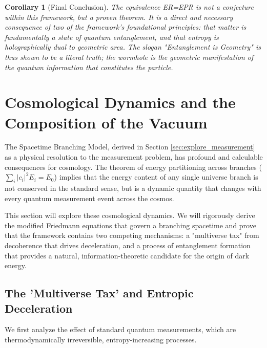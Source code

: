 \documentclass[11pt, letterpaper]{report}
\theoremstyle{plain} %
\newtheorem{corollary}[theorem]{Corollary}
\theoremstyle{definition} %
\theoremstyle{remark} %
\begin{document}
\begin{corollary}[Final Conclusion]
The equivalence ER=EPR is not a conjecture within this framework, but a proven theorem. It is a direct and necessary consequence of two of the framework's foundational principles: that matter is fundamentally a state of quantum entanglement, and that entropy is holographically dual to geometric area. The slogan "Entanglement is Geometry" is thus shown to be a literal truth; the wormhole is the geometric manifestation of the quantum information that constitutes the particle.
\end{corollary}






\section{Cosmological Dynamics and the Composition of the Vacuum}
\label{sec:explore_cosmology}

The Spacetime Branching Model, derived in Section \ref{sec:explore_measurement} as a physical resolution to the measurement problem, has profound and calculable consequences for cosmology. The theorem of energy partitioning across branches ($\sum_i |c_i|^2 E_i = E_0$) implies that the energy content of any single universe branch is not conserved in the standard sense, but is a dynamic quantity that changes with every quantum measurement event across the cosmos.

This section will explore these cosmological dynamics. We will rigorously derive the modified Friedmann equations that govern a branching spacetime and prove that the framework contains two competing mechanisms: a "multiverse tax" from decoherence that drives deceleration, and a process of entanglement formation that provides a natural, information-theoretic candidate for the origin of dark energy.

\subsection{The 'Multiverse Tax' and Entropic Deceleration}
\label{subsec:explore_deceleration}

We first analyze the effect of standard quantum measurements, which are thermodynamically irreversible, entropy-increasing processes.
\end{document}
